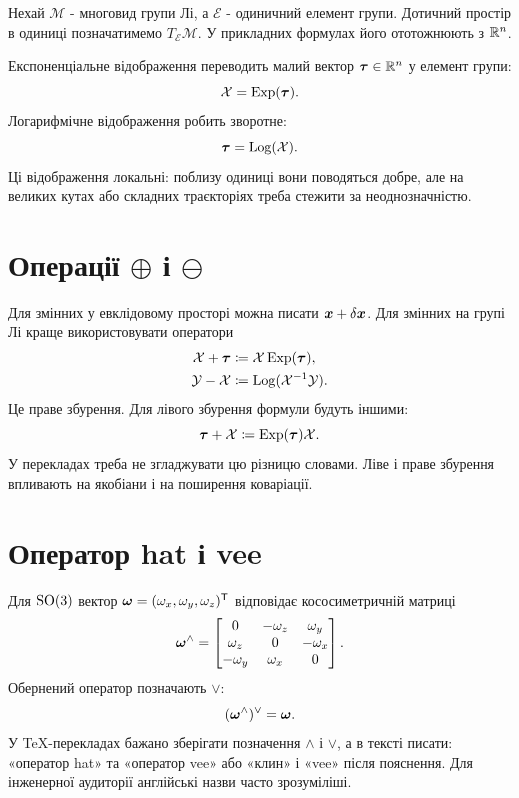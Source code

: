 Нехай $\mathcal{M}$ - многовид групи Лі, а $\mathcal{E}$ - одиничний елемент групи. Дотичний простір в одиниці позначатимемо $T_{\mathcal{E}}\mathcal{M}$. У прикладних формулах його ототожнюють з $\mathbb{R}^n$.

Експоненціальне відображення переводить малий вектор $\bm{\tau}\in\mathbb{R}^n$ у елемент групи:
\begin{equation}
    \mathcal{X}=\operatorname{Exp}(\bm{\tau}).
\end{equation}
Логарифмічне відображення робить зворотне:
\begin{equation}
    \bm{\tau}=\operatorname{Log}(\mathcal{X}).
\end{equation}
Ці відображення локальні: поблизу одиниці вони поводяться добре, але на великих кутах або складних траєкторіях треба стежити за неоднозначністю.

\section{Операції $\oplus$ і $\ominus$}

Для змінних у евклідовому просторі можна писати $\bm{x}+\delta\bm{x}$. Для змінних на групі Лі краще використовувати оператори
\begin{align}
    \mathcal{X}\oplus\vect{\tau} &\coloneqq \mathcal{X}\Exp(\vect{\tau}),\\
    \mathcal{Y}\ominus\mathcal{X} &\coloneqq \Log(\mathcal{X}^{-1}\mathcal{Y}).
\end{align}
Це праве збурення. Для лівого збурення формули будуть іншими:
\begin{equation}
    \vect{\tau}\oplus\mathcal{X}\coloneqq \Exp(\vect{\tau})\mathcal{X}.
\end{equation}
У перекладах треба не згладжувати цю різницю словами. Ліве і праве збурення впливають на якобіани і на поширення коваріації.

\section{Оператор hat і vee}

Для $\mathrm{SO}(3)$ вектор $\bm{\omega}=(\omega_x,\omega_y,\omega_z)^{\mathsf{T}}$ відповідає кососиметричній матриці
\begin{equation}
    \bm{\omega}^{\wedge}
    =
    \begin{bmatrix}
        0 & -\omega_z & \omega_y\\
        \omega_z & 0 & -\omega_x\\
        -\omega_y & \omega_x & 0
    \end{bmatrix}.
\end{equation}
Обернений оператор позначають $\vee$:
\begin{equation}
    (\bm{\omega}^{\wedge})^{\vee}=\bm{\omega}.
\end{equation}
У TeX-перекладах бажано зберігати позначення $\wedge$ і $\vee$, а в тексті писати: «оператор hat» та «оператор vee» або «клин» і «vee» після пояснення. Для інженерної аудиторії англійські назви часто зрозуміліші.

